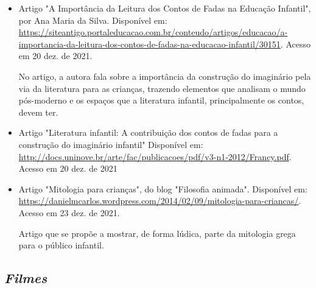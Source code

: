 \documentclass[11pt]{extarticle}
\begin{document}
\begin{itemize}
\item Artigo "A Importância da Leitura dos Contos de Fadas na Educação Infantil", por Ana Maria da Silva. Disponível em: \url{https://siteantigo.portaleducacao.com.br/conteudo/artigos/educacao/a-importancia-da-leitura-dos-contos-de-fadas-na-educacao-infantil/30151}. 
Acesso em 20 dez. de 2021.

No artigo, a autora fala sobre a importância da construção do imaginário pela via da literatura para as crianças, trazendo elementos que analisam o mundo pós-moderno e os espaços que a literatura infantil, principalmente os contos, devem ter.

\item Artigo "Literatura infantil: A contribuição dos contos de fadas para a construção do imaginário infantil" Disponível em: \url{http://docs.uninove.br/arte/fac/publicacoes/pdf/v3-n1-2012/Francy.pdf}. Acesso em 20 dez. de 2021

\item Artigo "Mitologia para crianças", do blog "Filosofia animada". Disponível em: \url{https://danielmcarlos.wordpress.com/2014/02/09/mitologia-para-criancas/}. Acesso em 23 dez. de 2021. 

Artigo que se propõe a mostrar, de forma lúdica, parte da mitologia grega para o público infantil.

\end{itemize}

\subsection{\textit{Filmes}}
\end{document}
